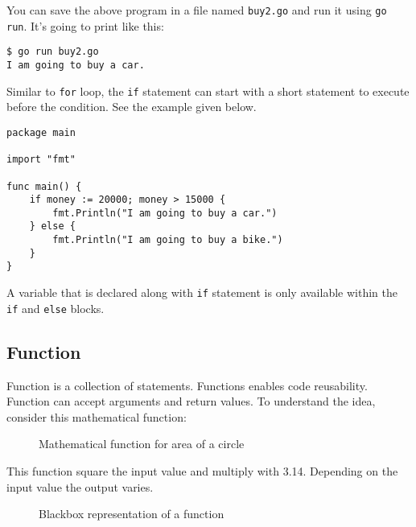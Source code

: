 You can save the above program in a file named \texttt{buy2.go} and
run it using \texttt{go run}.  It's going to print like this:

\begin{lstlisting}[numbers=none]
$ go run buy2.go
I am going to buy a car.
\end{lstlisting}

Similar to \texttt{for} loop, the \texttt{if} statement can start with
a short statement to execute before the condition.  See the example
given below.

\begin{lstlisting}
package main

import "fmt"

func main() {
    if money := 20000; money > 15000 {
        fmt.Println("I am going to buy a car.")
    } else {
        fmt.Println("I am going to buy a bike.")
    }
}
\end{lstlisting}

A variable that is declared along with \texttt{if} statement is only
available within the \texttt{if} and \texttt{else} blocks.

\subsection{Function}

Function is a collection of statements.  Functions
enables code reusability.  Function can accept arguments and return
values.  To understand the idea, consider this mathematical function:

\begin{figure}[h!]
\centering
{}
\caption{Mathematical function for area of a circle}
\end{figure}

This function square the input value and multiply with 3.14.
Depending on the input value the output varies.

\begin{figure}[h!]
\centering
{}
\caption{Blackbox representation of a function}
\end{figure}

